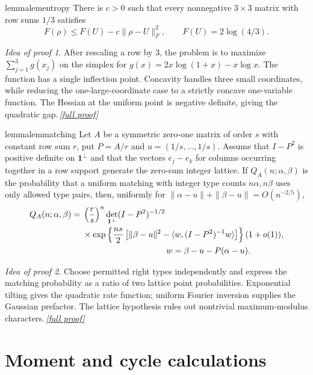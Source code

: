 \documentclass[11pt,a4paper]{article}
\theoremstyle{plain}
\theoremstyle{definition}
\theoremstyle{remark}
\newtheorem*{proofidea}{Idea of proof}
\newcommand{\fullproofref}[1]{\,\hyperref[#1]{\textit{[full proof]}}}
\newcommand{\one}{\mathbf 1}
\begin{document}
\begin{restatable}{lemma}{lementropy}\label{lem:entropy}
There is $c>0$ such that every nonnegative $3\times3$ matrix with row sums $1/3$
satisfies
\[
 F(\rho)\le F(U)-c\|\rho-U\|_F^2,
 \qquad F(U)=2\log(4/3).
\]
\end{restatable}
\begin{proofidea}
After rescaling a row by $3$, the problem is to maximize
$\sum_{j=1}^3g(x_j)$ on the simplex for
$g(x)=2x\log(1+x)-x\log x$.  The function has a single inflection point.  Concavity
handles three small coordinates, while reducing the one-large-coordinate case to a
strictly concave one-variable function.  The Hessian at the uniform point is negative
definite, giving the quadratic gap.\fullproofref{pf:entropy}
\end{proofidea}

\begin{restatable}{lemma}{lemmatching}\label{lem:matching}
Let $A$ be a symmetric zero-one matrix of order $s$ with constant row sum $r$, put
$P=A/r$ and $u=(1/s,\ldots,1/s)$.  Assume that $I-P^2$ is positive definite on
$\one^\perp$ and that the vectors $e_j-e_k$ for columns occurring together in a row
support generate the zero-sum integer lattice.  If $Q_A(n;\alpha,\beta)$ is the
probability that a uniform matching with integer type counts $n\alpha,n\beta$ uses only
allowed type pairs, then, uniformly for
$\|\alpha-u\|+\|\beta-u\|=O(n^{-2/5})$,
\begin{align*}
Q_A(n;\alpha,\beta)
={}&\left(\frac rs\right)^n
 \det_{\one^\perp}(I-P^2)^{-1/2}\\
&\times\exp\left\{\frac{ns}{2}
 \left[\|\beta-u\|^2-
 \langle w,(I-P^2)^{-1}w\rangle\right]\right\}(1+o(1)),\\
&\hspace{35mm}w=\beta-u-P(\alpha-u).
\end{align*}
\end{restatable}
\begin{proofidea}
Choose permitted right types independently and express the matching probability as a
ratio of two lattice point probabilities.  Exponential tilting gives the quadratic rate
function; uniform Fourier inversion supplies the Gaussian prefactor.  The lattice
hypothesis rules out nontrivial maximum-modulus characters.\fullproofref{pf:matching}
\end{proofidea}

\section{Moment and cycle calculations}
\end{document}
